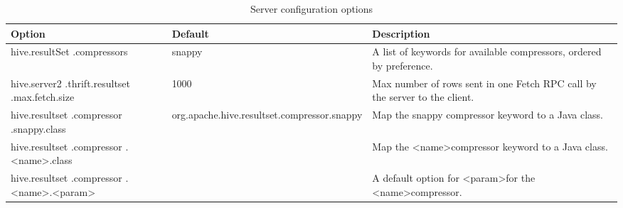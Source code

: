 \documentclass[11pt,a4paper]{article}
\begin{document}
		\begin{table}[H]
			\begin{tabular}{| p{3.5cm} | p{2.2cm} | p{5.3cm} |} \hline
				
				\textbf{Option} & \textbf{Default} & \textbf{Description} \\ \hline
				
				hive.resultSet\linebreak
				.compressors
				& snappy
				& A list of keywords for available compressors, ordered by preference.
				\\ \hline
				
				hive.server2\linebreak
				.thrift.resultset\linebreak
				.max.fetch.size
				& 1000
				& Max number of rows sent in one Fetch RPC call by the server to the client.
				\\ \hline
				
				hive.resultset\linebreak
				.compressor\linebreak
				.snappy.class
				& org.apache\linebreak.hive.resultset\linebreak.compressor\linebreak.snappy
				& Map the snappy compressor keyword to a Java class.
				\\ \hline
				
				hive.resultset\linebreak
				.compressor\linebreak
				.\textless name\textgreater .class
				&
				& Map the \textless name\textgreater\space compressor keyword to a Java class.
				\\ \hline
				
				hive.resultset\linebreak
				.compressor\linebreak
				.\textless name\textgreater.\textless param\textgreater
				&
				& A default option for \textless param\textgreater\space for the \textless name\textgreater\space compressor. 
				\\ \hline
				
			\end{tabular}
			\caption{Server configuration options}
		\end{table}
		
\end{document}
